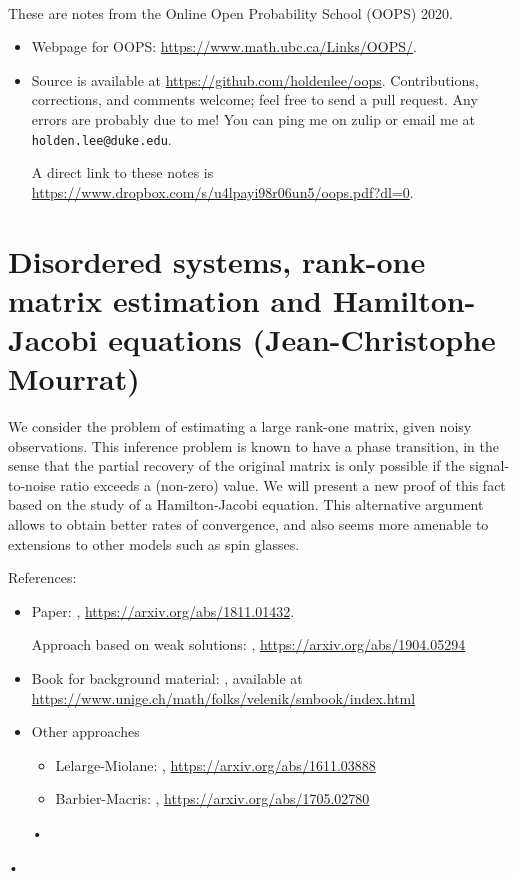 
~

These are notes from the Online Open Probability School (OOPS) 2020. 
\begin{itemize}
\item
Webpage for OOPS: \url{https://www.math.ubc.ca/Links/OOPS/}.
\item
Source is available at \url{https://github.com/holdenlee/oops}. Contributions, corrections, and comments welcome; feel free to send a pull request. Any errors are probably due to me! You can ping me on zulip or email me at \texttt{holden.lee@duke.edu}.

A direct link to these notes is \url{https://www.dropbox.com/s/u4lpayi98r06un5/oops.pdf?dl=0}.
\end{itemize}

\section{Disordered systems, rank-one matrix estimation and Hamilton-Jacobi equations (Jean-Christophe Mourrat)}

We consider the problem of estimating a large rank-one matrix, given noisy observations. This inference problem is known to have a phase transition, in the sense that the partial recovery of the original matrix is only possible if the signal-to-noise ratio exceeds a (non-zero) value. We will present a new proof of this fact based on the study of a Hamilton-Jacobi equation. This alternative argument allows to obtain better rates of convergence, and also seems more amenable to extensions to other models such as spin glasses. 

References:
\begin{itemize}
\item
Paper: \cite{mourrat2018hamilton}, \url{https://arxiv.org/abs/1811.01432}.

Approach based on weak solutions: \cite{mourrat2019hamilton}, \url{https://arxiv.org/abs/1904.05294}
\item
Book for background material: \cite{friedli2017statistical}, available at \url{https://www.unige.ch/math/folks/velenik/smbook/index.html}
\item Other approaches
\begin{itemize}
\item
Lelarge-Miolane: \cite{lelarge2019fundamental}, \url{https://arxiv.org/abs/1611.03888}
\item 
Barbier-Macris: \cite{barbier2019adaptive}, \url{https://arxiv.org/abs/1705.02780}
\end{itemize}•
\end{itemize}• 

